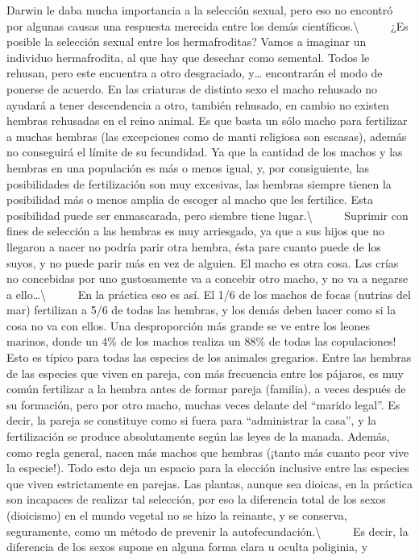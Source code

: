 Darwin le daba mucha importancia a la selección sexual, pero eso no
encontró por algunas causas una respuesta merecida entre los demás
científicos.\textbackslash{} ~ ~ ~ ¿Es posible la selección sexual entre
los hermafroditas? Vamos a imaginar un individuo hermafrodita, al que
hay que desechar como semental. Todos le rehusan, pero este encuentra a
otro desgraciado, y\ldots{} encontrarán el modo de ponerse de acuerdo.
En las criaturas de distinto sexo el macho rehusado no ayudará a tener
descendencia a otro, también rehusado, en cambio no existen hembras
rehusadas en el reino animal. Es que basta un sólo macho para fertilizar
a muchas hembras (las excepciones como de manti religiosa son escasas),
además no conseguirá el límite de su fecundidad. Ya que la cantidad de
los machos y las hembras en una populación es más o menos igual, y, por
consiguiente, las posibilidades de fertilización son muy excesivas, las
hembras siempre tienen la posibilidad más o menos amplia de escoger al
macho que les fertilice. Esta posibilidad puede ser enmascarada, pero
siembre tiene lugar.\textbackslash{} ~ ~ ~ Suprimir con fines de
selección a las hembras es muy arriesgado, ya que a sus hijos que no
llegaron a nacer no podría parir otra hembra, ésta pare cuanto puede de
los suyos, y no puede parir más en vez de alguien. El macho es otra
cosa. Las crías no concebidas por uno gustosamente va a concebir otro
macho, y no va a negarse a ello\ldots{}\textbackslash{} ~ ~ ~ En la
práctica eso es así. El 1/6 de los machos de focas (nutrias del mar)
fertilizan a 5/6 de todas las hembras, y los demás deben hacer como si
la cosa no va con ellos. Una desproporción más grande se ve entre los
leones marinos, donde un 4\% de los machos realiza un 88\% de todas las
copulaciones! Esto es típico para todas las especies de los animales
gregarios. Entre las hembras de las especies que viven en pareja, con
más frecuencia entre los pájaros, es muy común fertilizar a la hembra
antes de formar pareja (familia), a veces después de su formación, pero
por otro macho, muchas veces delante del ``marido legal''. Es decir, la
pareja se constituye como si fuera para ``administrar la casa'', y la
fertilización se produce absolutamente según las leyes de la manada.
Además, como regla general, nacen más machos que hembras (¡tanto más
cuanto peor vive la especie!). Todo esto deja un espacio para la
elección inclusive entre las especies que viven estrictamente en
parejas. Las plantas, aunque sea dioicas, en la práctica son incapaces
de realizar tal selección, por eso la diferencia total de los sexos
(dioicismo) en el mundo vegetal no se hizo la reinante, y se conserva,
seguramente, como un método de prevenir la
autofecundación.\textbackslash{} ~ ~ ~ Es decir, la diferencia de los
sexos supone en alguna forma clara u oculta poliginia, y

